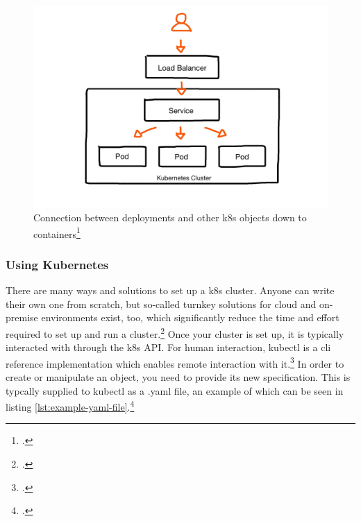 \begin{figure}
\includegraphics[scale=0.2]{pictures/loadbalancer.JPG} 
\caption{Connection between deployments and other \gls{k8s} objects down to containers\protect\footcite{nicoPictures}}
\label{fig:loadbalancer}
\end{figure}


\subsubsection{Using Kubernetes}
There are many ways and solutions to set up a \gls{k8s} cluster. Anyone can write their own one from scratch, but so-called turnkey solutions for cloud and on-premise environments exist, too, which significantly reduce the time and effort required to set up and run a cluster.\footcite[][, sections 'Turnkey Cloud Solutions' and 'On-Premises turnkey cloud solutions']{turnkey}
Once your cluster is set up, it is typically interacted with through the \gls{k8s} API. For human interaction, kubectl is a \gls{cli} reference implementation which enables remote interaction with it.\footcite[][, section 'The Kubernetes API']{k8sApi}
In order to create or manipulate an object, you need to provide its new specification. This is typcally supplied to kubectl as a .yaml file, an example of which can be seen in listing \ref{lst:example-yaml-file}.\footcite[][, section 'Describing a Kubernetes Object']{k8sObjects}

